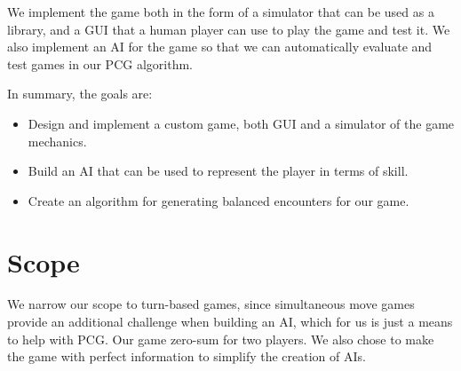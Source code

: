 We implement the game both in the form of a simulator that can be used as a
library, and a GUI that a human player can use to play the game and test it. We
also implement an AI for the game so that we can automatically evaluate and
test games in our PCG algorithm.

In summary, the goals are:

\begin{itemize}
\item Design and implement a custom game, both GUI and a simulator of the game mechanics.
\item Build an AI that can be used to represent the player in terms of skill.
\item Create an algorithm for generating balanced encounters for our game.
\end{itemize}

\section{Scope}

We narrow our scope to turn-based games, since simultaneous move games provide
an additional challenge when building an AI, which for us is just a means to
help with PCG\@. Our game zero-sum for two players. We also chose to make the
game with perfect information to simplify the creation of AIs.
